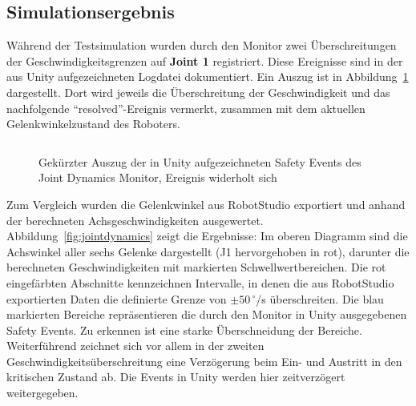 \subsection{Simulationsergebnis}

Während der Testsimulation wurden durch den Monitor zwei Überschreitungen der
Geschwindigkeitsgrenzen auf \textbf{Joint 1} registriert. Diese Ereignisse sind
in der aus Unity aufgezeichneten Logdatei dokumentiert. Ein Auszug ist in
Abbildung~\ref{lst:jointdynamics_json} dargestellt. Dort wird jeweils die
Überschreitung der Geschwindigkeit und das nachfolgende
\enquote{resolved}-Ereignis vermerkt, zusammen mit dem aktuellen
Gelenkwinkelzustand des Roboters.

\begin{figure}[H]
  \inputminted[fontsize=\footnotesize,breaklines]{json}{code-snippets/jointdynamicserror.json}
  \caption{Gekürzter Auszug der in Unity aufgezeichneten Safety
  Events des Joint Dynamics Monitor, Ereignis widerholt sich}
  \label{lst:jointdynamics_json}
\end{figure}

Zum Vergleich wurden die Gelenkwinkel aus RobotStudio exportiert und
anhand der berechneten
Achsgeschwindigkeiten ausgewertet. Abbildung~\ref{fig:jointdynamics}
zeigt die Ergebnisse:
Im oberen Diagramm sind die Achswinkel aller sechs Gelenke
dargestellt (J1 hervorgehoben in rot),
darunter die berechneten Geschwindigkeiten mit markierten Schwellwertbereichen.
Die rot eingefärbten Abschnitte kennzeichnen Intervalle, in denen die
aus RobotStudio
exportierten Daten die definierte Grenze von $\pm 50\,^\circ$/s überschreiten.
Die blau markierten Bereiche repräsentieren die durch den Monitor in
Unity ausgegebenen
Safety Events.
Zu erkennen ist eine starke Überschneidung der Bereiche.
Weiterführend zeichnet sich vor allem in der zweiten
Geschwindigkeitsüberschreitung eine Verzögerung beim Ein- und Austritt in den
kritischen Zustand ab. Die Events in Unity werden hier zeitverzögert
weitergegeben.

